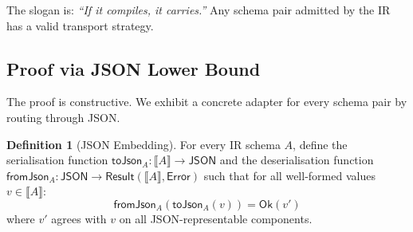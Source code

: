 \documentclass[11pt,a4paper]{article}
\theoremstyle{definition}
\newtheorem{definition}[theorem]{Definition}
\theoremstyle{remark}
\newcommand{\sem}[1]{\llbracket #1 \rrbracket}  %
\begin{document}
The slogan is: \emph{``If it compiles, it carries.''} Any schema
pair admitted by the IR has a valid transport strategy.

\subsection{Proof via JSON Lower Bound}\label{sec:json-proof}

The proof is constructive. We exhibit a concrete adapter for every
schema pair by routing through JSON.

\begin{definition}[JSON Embedding]\label{def:json-embed}
For every IR schema $A$, define the serialisation function
$\mathsf{toJson}_A : \sem{A} \to \mathsf{JSON}$ and the
deserialisation function
$\mathsf{fromJson}_A : \mathsf{JSON} \to \mathsf{Result}(\sem{A},
\mathsf{Error})$ such that for all well-formed values $v \in \sem{A}$:
\[
  \mathsf{fromJson}_A(\mathsf{toJson}_A(v)) = \mathsf{Ok}(v')
\]
where $v'$ agrees with $v$ on all JSON-representable components.
\end{definition}
\end{document}

